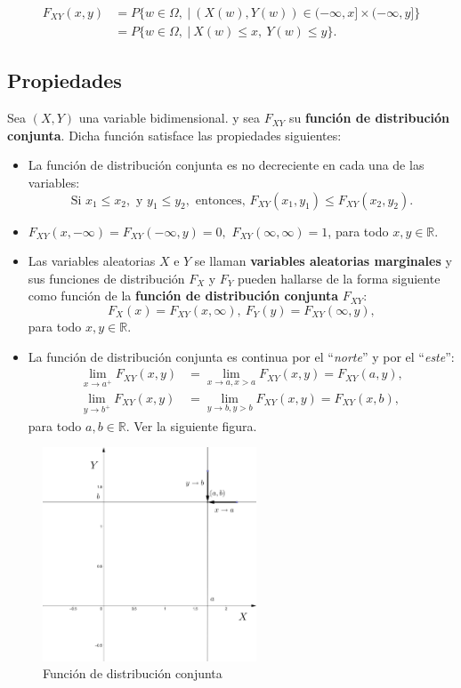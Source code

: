 \documentclass[]{book}
\begin{document}
\[
\begin{array}{rl}
F_{XY}(x,y) &= P\{w\in\Omega,\ |\ (X(w),Y(w))\in (-\infty,x]\times (-\infty,y]\} \\ 
&= P\{w\in\Omega,\ |\ X(w)\leq x,\ Y(w)\leq y\}.
\end{array}
\]

\hypertarget{propiedades-4}{%
\subsection{Propiedades}\label{propiedades-4}}

Sea \((X,Y)\) una variable bidimensional. y sea \(F_{XY}\) su \textbf{función de distribución conjunta}. Dicha función satisface las propiedades siguientes:

\begin{itemize}
\item
  La función de distribución conjunta es no decreciente en cada una de las variables:
  \[
  \mbox{Si }x_1\leq x_2, \mbox{ y }y_1\leq y_2,\mbox{ entonces, }F_{XY}(x_1,y_1)\leq F_{XY}(x_2,y_2).
  \]
\item
  \(F_{XY}(x,-\infty)=F_{XY}(-\infty,y)=0,\) \(F_{XY}(\infty,\infty)=1\), para todo \(x,y\in\mathbb{R}\).
\item
  Las variables aleatorias \(X\) e \(Y\) se llaman \textbf{variables aleatorias marginales} y sus funciones de distribución \(F_X\) y \(F_Y\) pueden hallarse de la forma siguiente como función de la \textbf{función de distribución conjunta} \(F_{XY}\):
  \[
  F_X(x)=F_{XY}(x,\infty),\ F_Y(y)=F_{XY}(\infty,y),
  \]
  para todo \(x,y\in\mathbb{R}\).
\item
  La función de distribución conjunta es continua por el ``\emph{norte}'' y por el ``\emph{este}'':
  \[
  \begin{array}{rl}
  \lim_{x\to a^+}F_{XY}(x,y) & =\lim_{x\to a, x> a}F_{XY}(x,y)=F_{XY}(a,y), \\
  \lim_{y\to b^+}F_{XY}(x,y) & =\lim_{y\to b, y> b}F_{XY}(x,y)=F_{XY}(x,b),
  \end{array}
  \]
  para todo \(a,b\in\mathbb{R}\). Ver la siguiente figura.
\end{itemize}

\begin{figure}
\includegraphics[width=2.5in]{Images/Fxy2} \caption{Función de distribución conjunta}\label{fig:bid5}
\end{figure}
\end{document}
